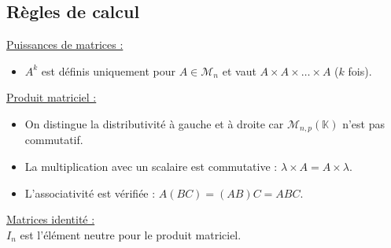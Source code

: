 
    \subsection{Règles de calcul}

        \underline{Puissances de matrices :}
        \begin{itemize}
            \item $A^k$ est définis uniquement pour $A \in \mathcal{M}_{n}$ et vaut $A \times A \times \dots \times A$ ($k$ fois).\vspace{5pt}
        \end{itemize}

        \underline{Produit matriciel :}
        \begin{itemize}
            \item On distingue la distributivité à gauche et à droite car $\mathcal{M}_{n,p}(\mathbb{K})$ n'est pas commutatif.
            \item La multiplication avec un scalaire est commutative : $\lambda \times A = A \times \lambda$.
            \item L'associativité est vérifiée : $A(B C) = (A B) C = ABC$.\vspace{5pt}
        \end{itemize}

        \underline{Matrices identité :}\\
        $I_n$ est l'élément neutre pour le produit matriciel.\vspace{5pt}

